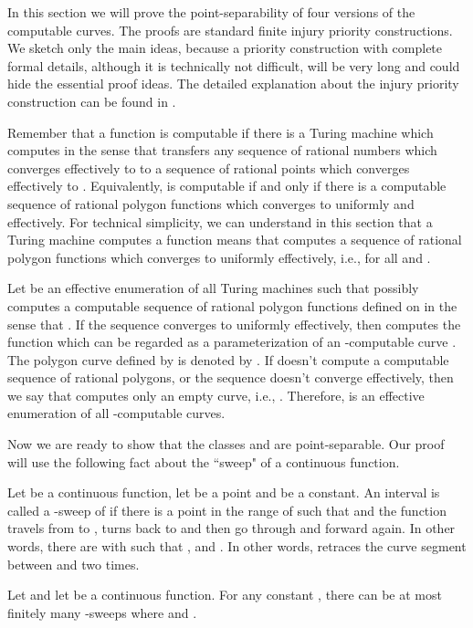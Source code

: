 \documentclass{LMCS}
\theoremstyle{plain}
\begin{document}
In this section we will prove the point-separability of four versions of the computable curves. The proofs are standard finite injury priority constructions. We sketch only the main ideas, because a priority construction with complete formal details, although it is technically not difficult, will be very long and could hide the essential proof ideas. The detailed explanation about the injury priority construction can be found in \cite{Soa87}.

Remember that a function  is computable if there is a Turing machine  which computes  in the sense that  transfers any sequence  of rational numbers which converges effectively to  to a sequence  of rational points which converges effectively to . Equivalently,  is computable if and only if there is a computable sequence  of rational polygon functions  which converges to  uniformly and effectively. For technical simplicity, we can understand in this section that a Turing machine  computes a function  means that  computes a sequence  of rational polygon functions which converges to  uniformly effectively, i.e.,  for all  and .

Let  be an effective enumeration of all Turing machines such that  possibly computes a computable sequence  of rational polygon functions defined on  in the sense that . If the sequence  converges to  uniformly effectively, then  computes the function  which can be regarded as a parameterization of an -computable curve . The polygon curve defined by  is denoted by . If  doesn't compute a computable sequence of rational polygons, or the sequence doesn't converge effectively, then we say that   computes only an empty curve, i.e., . Therefore,  is an effective enumeration of all -computable curves.

Now we are ready to show that the classes  and  are point-separable. Our proof will use the following fact about the ``sweep" of a continuous function.

Let  be a continuous function, let  be a point and  be a constant. An interval  is called a -sweep of  if there is a point  in the range of  such that   and the function  travels from  to , turns back to  and then go through  and forward again. In other words, there are  with   such that ,  and .  In other words,  retraces the curve segment between  and  two times.


\begin{lem}\label{lem-sweep}
Let  and let  be a continuous function. For any constant , there can be at most finitely many -sweeps where  and .
\end{lem}
\end{document}

